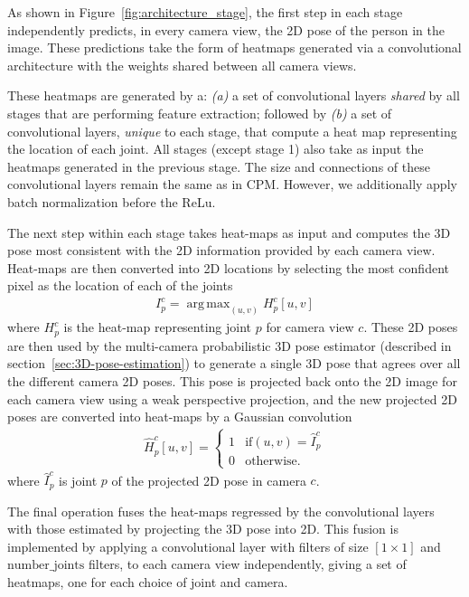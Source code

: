 \documentclass[10pt,twocolumn,letterpaper]{article}
\DeclareMathOperator*{\argmax}{arg\,max}
\begin{document}
As shown in Figure~\ref{fig:architecture_stage}, the first step in each
stage independently predicts, in every camera view, the 2D pose of
the person in the image. These predictions take the form of heatmaps generated
via a convolutional architecture with the weights shared between all camera views. 

These heatmaps are generated by a: {\em (a)} a set
of convolutional layers \emph{shared} by all stages that are performing feature
extraction; followed by {\em (b)} a set of convolutional layers, \emph{unique}
to each stage, that compute a heat map representing the location of each joint.
All stages (except stage 1) also take as input the heatmaps generated
in the previous stage.
The size and connections of these convolutional layers remain the same as in
CPM\cite{wei2016convolutional}. However, we additionally apply {batch normalization}
before the ReLu.

The next step within each stage takes heat-maps as input and computes
the 3D pose most consistent with the 2D information provided by each
camera view. Heat-maps are then converted into 2D locations by
selecting the most confident pixel as the location of each of the
joints
\begin{align*}
 I_p^c = \argmax_{(u,v)} H_p^c[u, v]
\end{align*}
where $H_p^c$ is the heat-map representing joint $p$ for camera view
$c$. These 2D poses are then used by the multi-camera probabilistic 3D
pose estimator (described in section~\ref{sec:3D-pose-estimation}) to
generate a single 3D pose that agrees over all the different camera 2D
poses. This pose is projected back onto the 2D image for each
camera view using a weak perspective projection, and the new projected
2D poses are converted into heat-maps by a Gaussian convolution 
\begin{align*}
 \hat H_p^c[u,v]=\begin{cases} 1 & \text{if} (u,v)=\hat{I}_p^c\\ 0 &
 \text{otherwise.}
 \end{cases}
\end{align*}
where $\hat{I}_p^c$ is joint $p$ of the projected 2D
pose in camera $c$.

The final operation fuses the heat-maps regressed by the convolutional
layers with those estimated by projecting the 3D pose into 2D. This
fusion is implemented by applying a convolutional layer with filters
of size $\left[1 \times 1 \right]$ and $\text{number\_joints}$
filters, to each camera view independently, giving a set of heatmaps,
one for each choice of  joint and camera.
\end{document}
